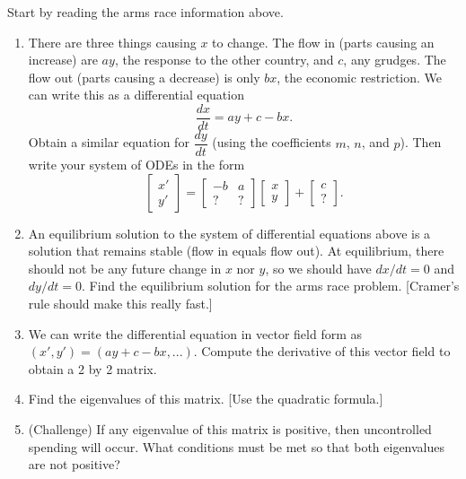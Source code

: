 \begin{problem}
Start by reading the arms race information above.
\begin{enumerate}
 \item There are three things causing $x$ to change. The flow in (parts causing an increase) are $ay$, the response to the other country, and $c$, any grudges.  The flow out (parts causing a decrease) is only $bx$, the economic restriction.  We can write this as a differential equation $$\frac{dx}{dt} = ay+c-bx.$$ Obtain a similar equation for $\dfrac{dy}{dt}$ (using the coefficients $m$, $n$, and $p$). Then write your system of ODEs in the form 
$$
\begin{bmatrix}x'\\y'\end{bmatrix}
=
\begin{bmatrix}-b&a\\?&?\end{bmatrix}
\begin{bmatrix}x\\y\end{bmatrix}
+
\begin{bmatrix}c\\?\end{bmatrix}.
$$ 
 \item An equilibrium solution to the system of differential equations above is a solution that remains stable (flow in equals flow out). At equilibrium, there should not be any future change in $x$ nor $y$, so we should have $dx/dt=0$ and $dy/dt=0$. Find the equilibrium solution for the arms race problem. [Cramer's rule should make this really fast.]
 \item We can write the differential equation in vector field form as $(x',y') = (ay+c-bx,...)$.  Compute the derivative of this vector field to obtain a 2 by 2 matrix.  
 \item Find the eigenvalues of this matrix. [Use the quadratic formula.] 
 \item (Challenge) If any eigenvalue of this matrix is positive, then uncontrolled spending will occur. What conditions must be met so that both eigenvalues are not positive?
\end{enumerate}
\end{problem}










